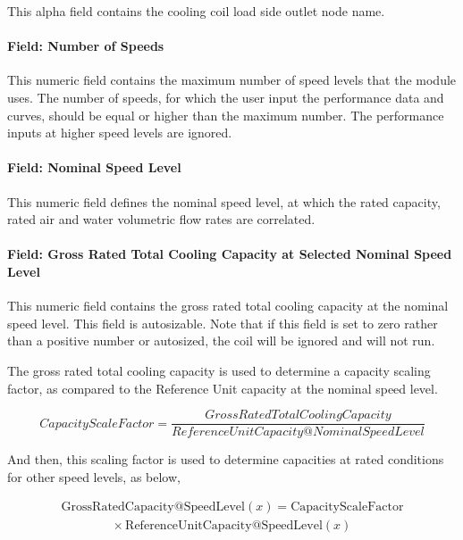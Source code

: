 This alpha field contains the cooling coil load side outlet node name.

\paragraph{Field: Number of Speeds}\label{field-number-of-speeds-4}

This numeric field contains the maximum number of speed levels that the module uses. The number of speeds, for which the user input the performance data and curves, should be equal or higher than the maximum number. The performance inputs at higher speed levels are ignored.

\paragraph{Field: Nominal Speed Level}\label{field-nominal-speed-level-2}

This numeric field defines the nominal speed level, at which the rated capacity, rated air and water volumetric flow rates are correlated.

\paragraph{Field: Gross Rated Total Cooling Capacity at Selected Nominal Speed Level}\label{field-gross-rated-total-cooling-capacity-at-selected-nominal-speed-level-1}

This numeric field contains the gross rated total cooling capacity at the nominal speed level. This field is autosizable. Note that if this field is set to zero rather than a positive number or autosized, the coil will be ignored and will not run.

The gross rated total cooling capacity is used to determine a capacity scaling factor, as compared to the Reference Unit capacity at the nominal speed level.

\begin{equation}
CapacityScaleFactor = \frac{{GrossRatedTotalCoolingCapacity}}{{ReferenceUnitCapacity@NominalSpeedLevel}}
\end{equation}

And then, this scaling factor is used to determine capacities at rated conditions for other speed levels, as below,

\begin{equation}
  \begin{array}{l}
    \mathrm{GrossRatedCapacity} @ \mathrm{SpeedLevel} \left( x \right) = \mathrm{CapacityScaleFactor} \\
    \quad \quad \quad \quad \times \mathrm{ReferenceUnitCapacity} @ \mathrm{SpeedLevel}( x )
  \end{array}
\end{equation}

